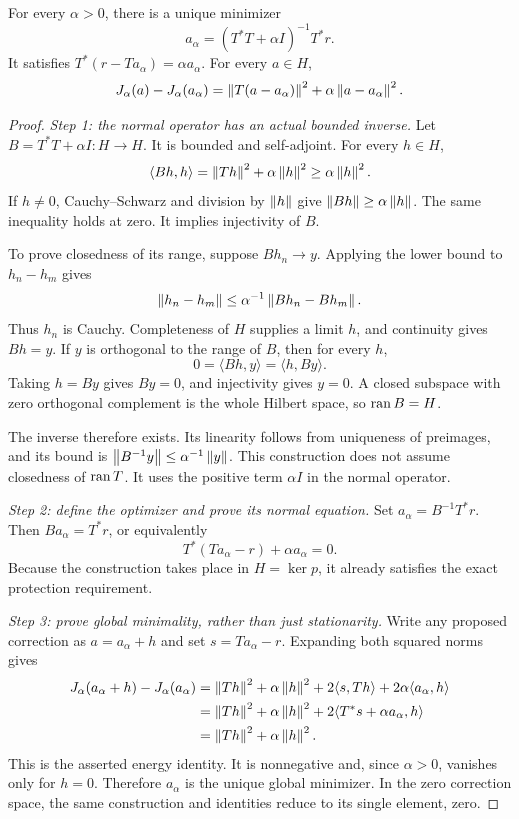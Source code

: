 \begin{theorem}\label{WR06}
For every $\alpha>0$, there is a unique minimizer
\[
 a_\alpha=(T^*T+\alpha I)^{-1}T^*r.
\]
It satisfies $T^*(r-Ta_\alpha)=\alpha a_\alpha$. For every $a\in H$,
\begin{equation}\label{eq:regularization-energy}
 J_\alpha(a)-J_\alpha(a_\alpha)
 =\left\lVert T(a-a_\alpha)\right\rVert^2+\alpha\left\lVert a-a_\alpha\right\rVert^2.
\end{equation}
\end{theorem}
\begin{proof}
\emph{Step 1: the normal operator has an actual bounded inverse.} Let $B=T^*T+\alpha I:H\to H$. It is bounded and self-adjoint. For every $h\in H$,
\[
 \langle Bh,h\rangle=\left\lVert Th\right\rVert^2+\alpha\left\lVert h\right\rVert^2
 \ge\alpha\left\lVert h\right\rVert^2.
\]
If $h\ne0$, Cauchy--Schwarz and division by $\left\lVert h\right\rVert$ give $\left\lVert Bh\right\rVert\ge\alpha\left\lVert h\right\rVert$. The same inequality holds at zero. It implies injectivity of $B$.

To prove closedness of its range, suppose $Bh_n\to y$. Applying the lower bound to $h_n-h_m$ gives
\[
 \left\lVert h_n-h_m\right\rVert\le\alpha^{-1}\left\lVert Bh_n-Bh_m\right\rVert.
\]
Thus $h_n$ is Cauchy. Completeness of $H$ supplies a limit $h$, and continuity gives $Bh=y$. If $y$ is orthogonal to the range of $B$, then for every $h$,
\[
 0=\langle Bh,y\rangle=\langle h,By\rangle.
\]
Taking $h=By$ gives $By=0$, and injectivity gives $y=0$. A closed subspace with zero orthogonal complement is the whole Hilbert space, so $\operatorname{ran} B=H$.

The inverse therefore exists. Its linearity follows from uniqueness of preimages, and its bound is $\left\lVert B^{-1}y\right\rVert\le\alpha^{-1}\left\lVert y\right\rVert$. This construction does not assume closedness of $\operatorname{ran} T$. It uses the positive term $\alpha I$ in the normal operator.

\emph{Step 2: define the optimizer and prove its normal equation.} Set $a_\alpha=B^{-1}T^*r$. Then $Ba_\alpha=T^*r$, or equivalently
\[
 T^*(Ta_\alpha-r)+\alpha a_\alpha=0.
\]
Because the construction takes place in $H=\ker p$, it already satisfies the exact protection requirement.

\emph{Step 3: prove global minimality, rather than just stationarity.} Write any proposed correction as $a=a_\alpha+h$ and set $s=Ta_\alpha-r$. Expanding both squared norms gives
\[
\begin{aligned}
 J_\alpha(a_\alpha+h)-J_\alpha(a_\alpha)
 &=\left\lVert Th\right\rVert^2+\alpha\left\lVert h\right\rVert^2
     +2\langle s,Th\rangle+2\alpha\langle a_\alpha,h\rangle\\
 &=\left\lVert Th\right\rVert^2+\alpha\left\lVert h\right\rVert^2
     +2\langle T^*s+\alpha a_\alpha,h\rangle\\
 &=\left\lVert Th\right\rVert^2+\alpha\left\lVert h\right\rVert^2.
\end{aligned}
\]
This is the asserted energy identity. It is nonnegative and, since $\alpha>0$, vanishes only for $h=0$. Therefore $a_\alpha$ is the unique global minimizer. In the zero correction space, the same construction and identities reduce to its single element, zero.
\end{proof}

